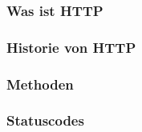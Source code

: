 \subsubsection{Was ist HTTP}
    \label{Was ist HTTP }
    

\subsubsection{Historie von HTTP}
    \label{Historie von HTTP}
    
\pagebreak

\subsubsection{Methoden}
  \label{HTTP-Methoden}
  
\pagebreak

\subsubsection{Statuscodes}
  \label{HTTP-Statuscodes}
  
\pagebreak